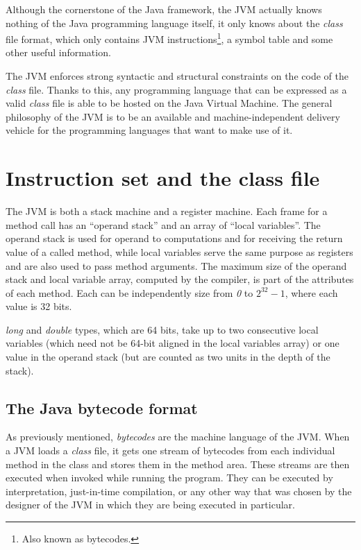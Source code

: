 \documentclass[english,runningheads,a4paper]{llncs}[2018/03/10]
\begin{document}
Although the cornerstone of the Java framework, the JVM actually knows nothing
of the Java programming language itself, it only knows about the \textit{class}
file format, which only contains JVM instructions\footnote{Also known as
bytecodes.}, a symbol table and some other useful information.

The JVM enforces strong syntactic and structural constraints on the code of the
\textit{class} file. Thanks to this, any programming language that can be
expressed as a valid \textit{class} file is able to be hosted on the Java
Virtual Machine. The general philosophy of the JVM is to be an available and
machine-independent delivery vehicle for the programming languages that want to
make use of it.

\section*{Instruction set and the class file}
The JVM is both a stack machine and a register machine. Each frame for a method
call has an ``operand stack'' and an array of ``local variables''. The operand
stack is used for operand to computations and for receiving the return value of
a called method, while local variables serve the same purpose as registers and
are also used to pass method arguments. The maximum size of the operand stack
and local variable array, computed by the compiler, is part of the attributes of
each method. Each can be independently size from \textit{0} to \(2^{32} - 1\),
where each value is 32 bits.

\textit{long} and \textit{double} types, which are 64 bits, take up to two
consecutive local variables (which need not be 64-bit aligned in the local
variables array) or one value in the operand stack (but are counted as two units
in the depth of the stack).

\subsection*{The Java bytecode format}
As previously mentioned, \textit{bytecodes} are the machine language of the JVM.
When a JVM loads a \textit{class} file, it gets one stream of bytecodes from
each individual method in the class and stores them in the method area. These
streams are then executed when invoked while running the program. They can be
executed by interpretation, just-in-time compilation, or any other way that was
chosen by the designer of the JVM in which they are being executed in
particular.
\end{document}
